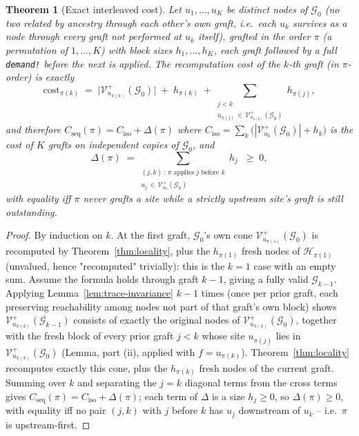 \documentclass[11pt,a4paper]{article}
\newtheorem{theorem}{Theorem}
\newcommand{\G}{\mathcal{G}}
\newcommand{\Hb}{\mathcal{H}}
\newcommand{\V}{\mathcal{V}}
\begin{document}
\begin{theorem}[Exact interleaved cost]
\label{thm:sequential}
Let $u_1, \dots, u_K$ be distinct nodes of $\G_0$ (no two related by ancestry through each other's
own graft, i.e.\ each $u_k$ survives as a node through every graft not performed at $u_k$ itself),
grafted in the order $\pi$ (a permutation of $1,\dots,K$) with block sizes $h_1,\dots,h_K$, each
graft followed by a full \texttt{demand!} before the next is applied. The recomputation cost of
the $k$-th graft (in $\pi$-order) is exactly
\[
\mathrm{cost}_{\pi(k)} \;=\; \big|\V_{u_{\pi(k)}}^{+}(\G_0)\big| \;+\; h_{\pi(k)} \;+\!\!
\sum_{\substack{j < k \\ u_{\pi(j)} \,\in\, \V_{u_{\pi(k)}}^{+}(\G_0)}}\!\! h_{\pi(j)},
\]
and therefore $C_{\mathrm{seq}}(\pi) = C_{\mathrm{iso}} + \Delta(\pi)$ where $C_{\mathrm{iso}} =
\sum_k \big(|\V_{u_k}^+(\G_0)| + h_k\big)$ is the cost of $K$ grafts on independent copies of
$\G_0$, and
\[
\Delta(\pi) \;=\!\! \sum_{\substack{(j,k) \,:\, \pi\text{ applies } j \text{ before } k \\ u_j \,\in\, \V_{u_k}^+(\G_0)}}\!\! h_j \;\;\ge\; 0,
\]
with equality iff $\pi$ never grafts a site while a strictly upstream site's graft is still
outstanding.
\end{theorem}

\begin{proof}
By induction on $k$. At the first graft, $\G_{0}$'s own cone $\V_{u_{\pi(1)}}^{+}(\G_0)$ is
recomputed by Theorem~\ref{thm:locality}, plus the $h_{\pi(1)}$ fresh nodes of $\Hb_{\pi(1)}$
(unvalued, hence "recomputed" trivially): this is the $k=1$ case with an empty sum. Assume the
formula holds through graft $k-1$, giving a fully valid $\G_{k-1}$. Applying
Lemma~\ref{lem:trace-invariance} $k-1$ times (once per prior graft, each preserving reachability
among nodes not part of that graft's own block) shows $\V_{u_{\pi(k)}}^+(\G_{k-1})$ consists of
exactly the original nodes of $\V_{u_{\pi(k)}}^+(\G_0)$, together with the fresh block of every
prior graft $j < k$ whose site $u_{\pi(j)}$ lies in $\V_{u_{\pi(k)}}^+(\G_0)$ (Lemma, part (ii),
applied with $f = u_{\pi(k)}$). Theorem~\ref{thm:locality} recomputes exactly this cone, plus the
$h_{\pi(k)}$ fresh nodes of the current graft. Summing over $k$ and separating the $j=k$ diagonal
terms from the cross terms gives $C_{\mathrm{seq}}(\pi) = C_{\mathrm{iso}} + \Delta(\pi)$; each term
of $\Delta$ is a size $h_j \geq 0$, so $\Delta(\pi) \geq 0$, with equality iff no pair $(j,k)$ with
$j$ before $k$ has $u_j$ downstream of $u_k$ -- i.e.\ $\pi$ is upstream-first.
\end{proof}
\end{document}

